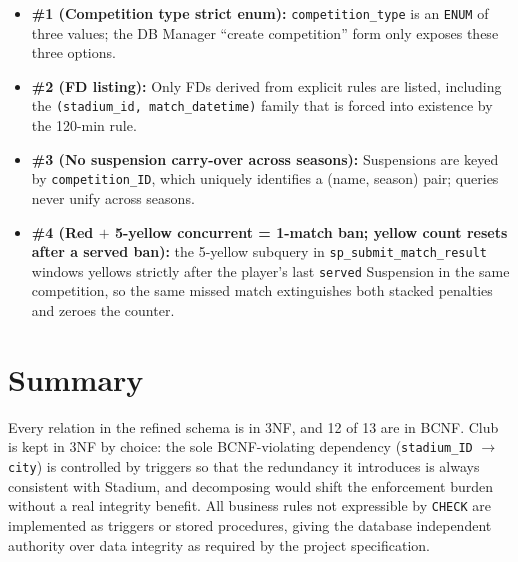 \documentclass[11pt]{article}
\begin{document}
\begin{itemize}[leftmargin=*]
  \item \textbf{\#1 (Competition type strict enum):}
    \texttt{competition\_type} is an \texttt{ENUM} of three values; the
    DB Manager ``create competition'' form only exposes these three
    options.
  \item \textbf{\#2 (FD listing):} Only FDs derived from explicit rules
    are listed, including the \texttt{(stadium\_id, match\_datetime)}
    family that is forced into existence by the 120-min rule.
  \item \textbf{\#3 (No suspension carry-over across seasons):}
    Suspensions are keyed by \texttt{competition\_ID}, which uniquely
    identifies a (name, season) pair; queries never unify across
    seasons.
  \item \textbf{\#4 (Red $+$ 5-yellow concurrent = 1-match ban; yellow
    count resets after a served ban):} the 5-yellow subquery in
    \texttt{sp\_submit\_match\_result} windows yellows strictly after
    the player's last \texttt{served} Suspension in the same
    competition, so the same missed match extinguishes both stacked
    penalties and zeroes the counter.
\end{itemize}

\section{Summary}

Every relation in the refined schema is in 3NF, and 12 of 13 are in
BCNF. Club is kept in 3NF by choice: the sole BCNF-violating dependency
(\texttt{stadium\_ID} $\to$ \texttt{city}) is controlled by triggers so
that the redundancy it introduces is always consistent with Stadium,
and decomposing would shift the enforcement burden without a real
integrity benefit. All business rules not expressible by
\texttt{CHECK} are implemented as triggers or stored procedures, giving
the database independent authority over data integrity as required by
the project specification.
\end{document}

